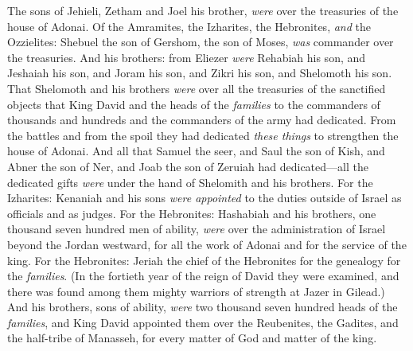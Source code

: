 \begin{biblechapter}
\verse The sons of Jehieli, Zetham and Joel his brother, \textit{were} over the treasuries of the house of Adonai.
\verse Of the Amramites, the Izharites, the Hebronites, \textit{and} the Ozzielites:
\verse Shebuel the son of Gershom, the son of Moses, \textit{was} commander over the treasuries.
\verse And his brothers: from Eliezer \textit{were} Rehabiah his son, and Jeshaiah his son, and Joram his son, and Zikri his son, and Shelomoth his son.
\verse That Shelomoth and his brothers \textit{were} over all the treasuries of the sanctified objects that King David and the heads of the \textit{families} to the commanders of thousands and hundreds and the commanders of the army had dedicated.
\verse From the battles and from the spoil they had dedicated \textit{these things} to strengthen the house of Adonai.
\verse And all that Samuel the seer, and Saul the son of Kish, and Abner the son of Ner, and Joab the son of Zeruiah had dedicated—all the dedicated gifts \textit{were} under the hand of Shelomith and his brothers.
\verse For the Izharites: Kenaniah and his sons \textit{were appointed} to the duties outside of Israel as officials and as judges.
\verse For the Hebronites: Hashabiah and his brothers, one thousand seven hundred men of ability, \textit{were} over the administration of Israel beyond the Jordan westward, for all the work of Adonai and for the service of the king.
\verse For the Hebronites: Jeriah the chief of the Hebronites for the genealogy for the \textit{families}. (In the fortieth year of the reign of David they were examined, and there was found among them mighty warriors of strength at Jazer in Gilead.)
\verse And his brothers, sons of ability, \textit{were} two thousand seven hundred heads of the \textit{families}, and King David appointed them over the Reubenites, the Gadites, and the half-tribe of Manasseh, for every matter of God and matter of the king.
\end{biblechapter}

